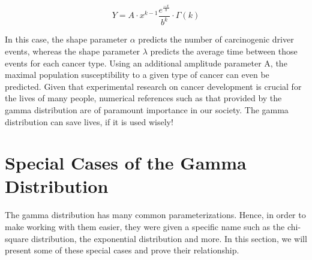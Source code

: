 \documentclass[12pt]{article}
\begin{document}
\begin{equation*}
	Y = A\cdot x^{k-1}\frac{e^{\frac{-x}{b}}}{b^k}\cdot\Gamma(k)
\end{equation*}

In this case, the shape parameter $\alpha$ predicts the number of carcinogenic driver events, whereas the shape
parameter $\lambda$ predicts the average time between those events for each cancer type. Using an additional amplitude
parameter A, the maximal population susceptibility to a given type of cancer can even be
predicted\cite{belikovNumberKeyCarcinogenic2017}. Given that experimental research on cancer development is crucial for
the lives of many people, numerical references such as that provided by the gamma distribution are of paramount
importance in our society. The gamma distribution can save lives, if it is used wisely!



\pagebreak
\section{Special Cases of the Gamma Distribution}
The gamma distribution has many common parameterizations. Hence, in order to make working with them easier, they were
given a specific name such as the chi-square distribution, the exponential distribution and more. In this section, we
will present some of these special cases and prove their relationship.
\end{document}
